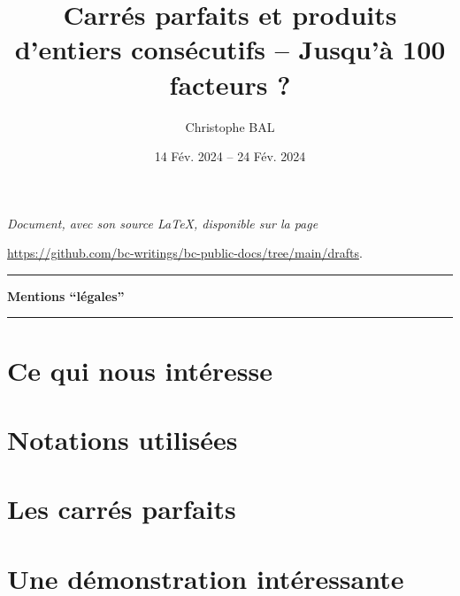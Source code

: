 \documentclass[12pt]{amsart}
\newcommand\contentdir{\jobname}
\begin{document}
\title{Carrés parfaits et produits d'entiers consécutifs -- Jusqu'à 100 facteurs ?}
\author{Christophe BAL}
\date{14 Fév. 2024 -- 24 Fév. 2024}

\maketitle

\begin{center}
	\itshape
	Document, avec son source \LaTeX, disponible sur la page

	\url{https://github.com/bc-writings/bc-public-docs/tree/main/drafts}.
\end{center}


\bigskip


\begin{center}
	\hrule\vspace{.3em}
	{
		\fontsize{1.35em}{1em}\selectfont
		\textbf{Mentions \enquote{légales}}
	}

	\vspace{0.45em}
	\small
	\doclicenseThis
	\hrule
\end{center}


\setcounter{tocdepth}{3}
\tableofcontents




\newpage
\section{Ce qui nous intéresse}






\bigskip
\section{Notations utilisées}






\newpage
\section{Les carrés parfaits} \label{case-1}






\section{Une démonstration intéressante} \label{case-10}
\end{document}
